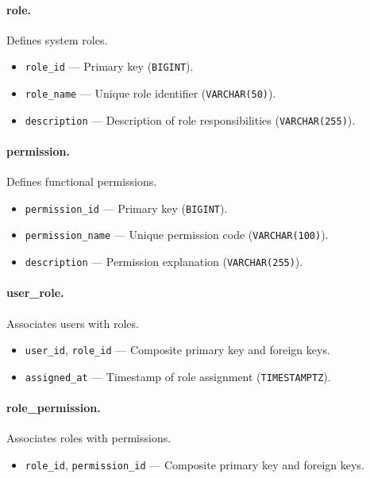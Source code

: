 \paragraph{role.}
Defines system roles.
\begin{itemize}
    \item \texttt{role\_id} — Primary key (\texttt{BIGINT}).
    \item \texttt{role\_name} — Unique role identifier (\texttt{VARCHAR(50)}).
    \item \texttt{description} — Description of role responsibilities (\texttt{VARCHAR(255)}).
\end{itemize}

\paragraph{permission.}
Defines functional permissions.
\begin{itemize}
    \item \texttt{permission\_id} — Primary key (\texttt{BIGINT}).
    \item \texttt{permission\_name} — Unique permission code (\texttt{VARCHAR(100)}).
    \item \texttt{description} — Permission explanation (\texttt{VARCHAR(255)}).
\end{itemize}

\paragraph{user\_role.}
Associates users with roles.
\begin{itemize}
    \item \texttt{user\_id}, \texttt{role\_id} — Composite primary key and foreign keys.
    \item \texttt{assigned\_at} — Timestamp of role assignment (\texttt{TIMESTAMPTZ}).
\end{itemize}

\paragraph{role\_permission.}
Associates roles with permissions.
\begin{itemize}
    \item \texttt{role\_id}, \texttt{permission\_id} — Composite primary key and foreign keys.
\end{itemize}

